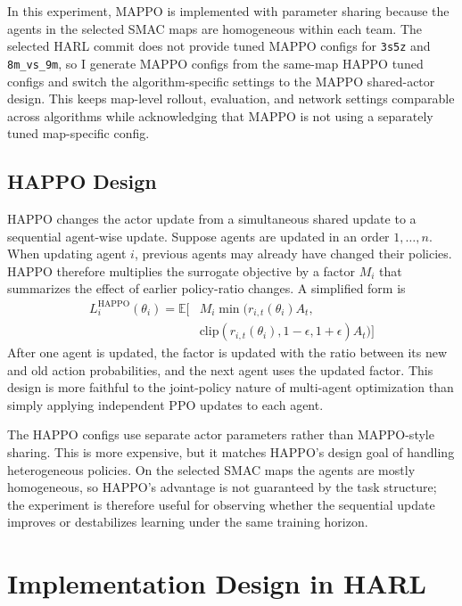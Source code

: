 \documentclass{article}
\begin{document}
In this experiment, MAPPO is implemented with parameter sharing because the agents in the selected SMAC maps are homogeneous within each team. The selected HARL commit does not provide tuned MAPPO configs for \texttt{3s5z} and \texttt{8m\_vs\_9m}, so I generate MAPPO configs from the same-map HAPPO tuned configs and switch the algorithm-specific settings to the MAPPO shared-actor design. This keeps map-level rollout, evaluation, and network settings comparable across algorithms while acknowledging that MAPPO is not using a separately tuned map-specific config.

\subsection{HAPPO Design}

HAPPO changes the actor update from a simultaneous shared update to a sequential agent-wise update. Suppose agents are updated in an order \(1,\ldots,n\). When updating agent \(i\), previous agents may already have changed their policies. HAPPO therefore multiplies the surrogate objective by a factor \(M_i\) that summarizes the effect of earlier policy-ratio changes. A simplified form is
\begin{equation}
\begin{aligned}
L_i^{\text{HAPPO}}(\theta_i)
= \mathbb{E}\Big[
& M_i \min\big(
r_{i,t}(\theta_i) A_t, \\
& \mathrm{clip}(r_{i,t}(\theta_i), 1-\epsilon, 1+\epsilon) A_t
\big)
\Big]
\end{aligned}
\end{equation}
After one agent is updated, the factor is updated with the ratio between its new and old action probabilities, and the next agent uses the updated factor. This design is more faithful to the joint-policy nature of multi-agent optimization than simply applying independent PPO updates to each agent.

The HAPPO configs use separate actor parameters rather than MAPPO-style sharing. This is more expensive, but it matches HAPPO's design goal of handling heterogeneous policies. On the selected SMAC maps the agents are mostly homogeneous, so HAPPO's advantage is not guaranteed by the task structure; the experiment is therefore useful for observing whether the sequential update improves or destabilizes learning under the same training horizon.

\section{Implementation Design in HARL}
\end{document}
